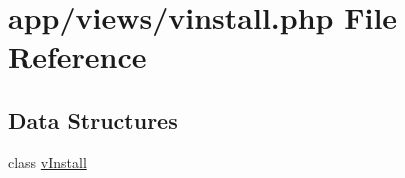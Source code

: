 \hypertarget{vinstall_8php}{}\section{app/views/vinstall.php File Reference}
\label{vinstall_8php}
\subsection*{Data Structures}
\begin{DoxyCompactItemize}
\item 
class \hyperlink{classvInstall}{v\+Install}
\end{DoxyCompactItemize}
